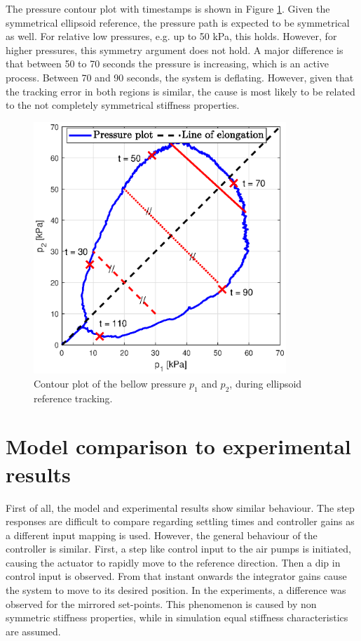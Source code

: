 The pressure contour plot with timestamps is shown in Figure \ref{fig5:pressureellips}. Given the symmetrical ellipsoid reference, the pressure path is expected to be symmetrical as well. For relative low pressures, e.g. up to 50 kPa, this holds. However, for higher pressures, this symmetry argument does not hold. A major difference is that between 50 to 70 seconds the pressure is increasing, which is an active process. Between 70 and 90 seconds, the system is deflating. However, given that the tracking error in both regions is similar, the cause is most likely to be related to the not completely symmetrical stiffness properties.  





\begin{figure}[H] 
       \centering
    \includegraphics[width = 0.85\textwidth]{Figures/Chapter5/pcontourellips.eps}
    \caption{Contour plot of the bellow pressure $p_1$ and $p_2$, during ellipsoid reference tracking.}
    \label{fig5:pressureellips}
\end{figure}

\clearpage

\section{Model comparison to experimental results}

First of all, the model and experimental results show similar behaviour. The step responses are difficult to compare regarding settling times and controller gains as a different input mapping is used. However, the general behaviour of the controller is similar. First, a step like control input to the air pumps is initiated, causing the actuator to rapidly move to the reference direction. Then a dip in control input is observed. From that instant onwards the integrator gains cause the system to move to its desired position. In the experiments, a difference was observed for the mirrored set-points. This phenomenon is caused by non symmetric stiffness properties, while in simulation equal stiffness characteristics are assumed. 

